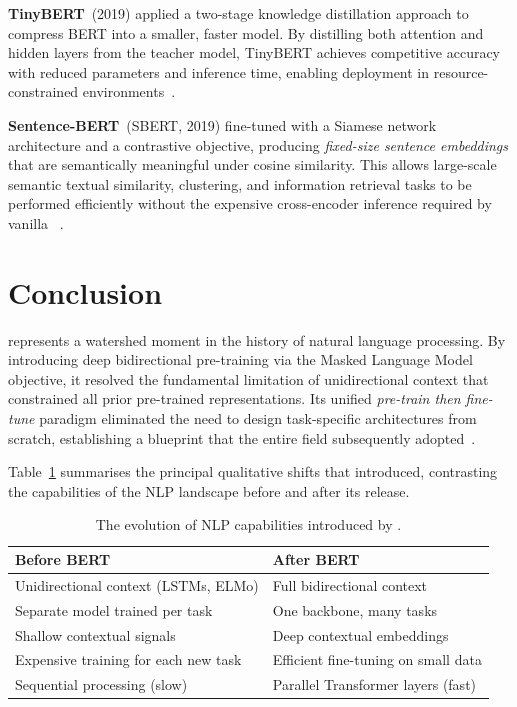 \textbf{TinyBERT}~(2019) applied a two-stage knowledge distillation approach 
to compress BERT into a smaller, faster model. By distilling both attention 
and hidden layers from the teacher model, TinyBERT achieves competitive 
accuracy with reduced parameters and inference time, enabling deployment 
in resource-constrained environments~\cite{jiao2019tinybert}.


\textbf{Sentence-BERT}~(SBERT, 2019) fine-tuned \bert{} with a Siamese network
architecture and a contrastive objective, producing \emph{fixed-size sentence
embeddings} that are semantically meaningful under cosine similarity.  This allows
large-scale semantic textual similarity, clustering, and information retrieval tasks
to be performed efficiently without the expensive cross-encoder inference required by
vanilla \bert{}~\cite{reimers2019sentencebert}.



\section{Conclusion}
\label{sec:conclusion}

\bert{} represents a watershed moment in the history of natural language processing.
By introducing deep bidirectional pre-training via the Masked Language Model
objective, it resolved the fundamental limitation of unidirectional context that
constrained all prior pre-trained representations.  Its unified \emph{pre-train then
fine-tune} paradigm eliminated the need to design task-specific architectures from
scratch, establishing a blueprint that the entire field subsequently
adopted~\cite{devlin2019bert}.

Table~\ref{tab:before-after-bert} summarises the principal qualitative shifts that
\bert{} introduced, contrasting the capabilities of the NLP landscape before and
after its release.

\begin{table}[ht]
\centering
\caption{The evolution of NLP capabilities introduced by \bert{}.}
\label{tab:before-after-bert}
\renewcommand{\arraystretch}{1.4}
\begin{tabular}{p{} p{}}
\hline
\textbf{Before BERT} & \textbf{After BERT} \\ \hline
Unidirectional context (LSTMs, ELMo) & Full bidirectional context \\
Separate model trained per task & One backbone, many tasks \\
Shallow contextual signals & Deep contextual embeddings \\
Expensive training for each new task & Efficient fine-tuning on small data \\
Sequential processing (slow) & Parallel Transformer layers (fast) \\ \hline
\end{tabular}
\end{table}

